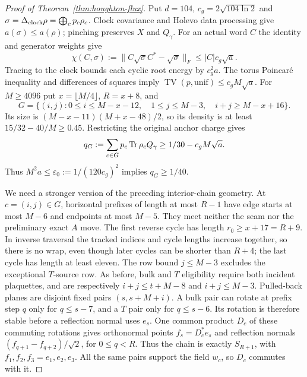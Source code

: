 \begin{proof}[Proof of Theorem~\ref{thm:houghton-flux}]
Put $d=104$, $c_g=2\sqrt{104\ln2}$ and
$\sigma=\Delta_{\rm clock}\rho=\bigoplus_cp_c\rho_c$.
Clock covariance and Holevo data processing give $a(\sigma)\leq a(\rho)$;
pinching preserves $X$ and $Q_\gamma$.
For an actual word $C$ the identity and generator weights give
\[
 \chi(C,\sigma):=\|C\sqrt\sigma C^*-\sqrt\sigma\|_F
       \leq |C|c_g\sqrt a.
\]
Tracing to the clock bounds each cyclic root energy by $c_g^2a$.
The torus Poincar\'e inequality and differences of squares imply
$\operatorname{TV}(p,\mathrm{unif})\leq c_gM\sqrt a$.
For $M\geq4096$ put $x=\lfloor M/4\rfloor$, $R=x+8$, and
\[
 G=\{(i,j):0\leq i\leq M-x-12,\quad
               1\leq j\leq M-3,\quad i+j\geq M-x+16\}.
\]
Its size is $(M-x-11)(M+x-48)/2$, so its density is at least
$15/32-40/M\geq0.45$. Restricting the original anchor charge gives
\begin{equation}\label{eq:houghton-wedge-charge}
 q_G:=\sum_{c\in G}p_c\operatorname{Tr}\rho_cQ_\gamma
       \geq1/30-c_gM\sqrt a.
\end{equation}
Thus $M^2a\leq\varepsilon_0:=1/(120c_g)^2$ implies $q_G\geq1/40$.

We need a stronger version of the preceding interior-chain geometry.
At $c=(i,j)\in G$, horizontal prefixes of length at most $R-1$
have edge starts at most $M-6$ and endpoints at most $M-5$.
They meet neither the seam nor the preliminary exact $A$ move.
The first reverse cycle has length $r_0\geq x+17=R+9$.
In inverse traversal the tracked indices and cycle lengths increase
together, so there is no wrap, even though later cycles can be
shorter than $R+4$; the last cycle has length at least eleven.
The row bound $j\leq M-3$ excludes the exceptional $T$-source row.
As before, bulk and $T$ eligibility require both incident plaquettes,
and are respectively $i+j\leq t+M-8$ and $i+j\leq M-3$.
Pulled-back planes are disjoint fixed pairs $(s,s+M+i)$.
A bulk pair can rotate at prefix step $q$ only for $q\leq s-7$,
and a $T$ pair only for $q\leq s-6$. Its rotation is therefore
stable before a reflection normal uses $e_s$.
One common product $D_c$ of these commuting rotations gives
orthonormal points $f_s=D_c^*e_s$ and reflection normals
$(f_{q+1}-f_{q+2})/\sqrt2$, for $0\leq q<R$.
Thus the chain is exactly $S_{R+1}$, with
$f_1,f_2,f_3=e_1,e_2,e_3$.
All the same pairs support the field $w_c$, so $D_c$ commutes with it.


\end{proof}
